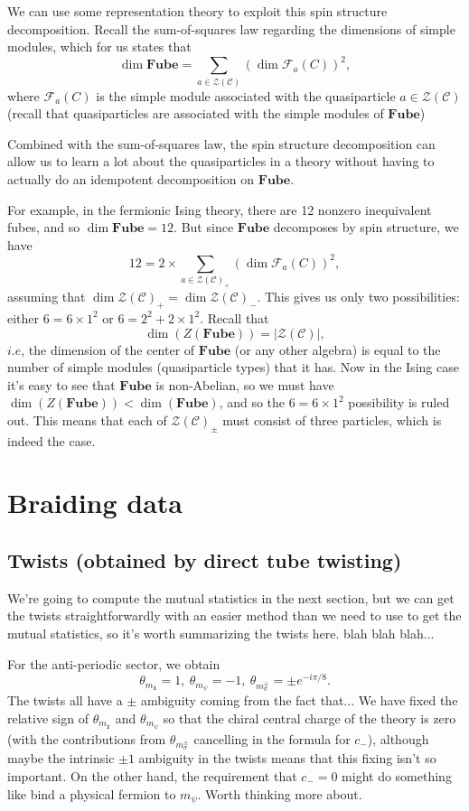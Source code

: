 \documentclass[12pt,a4paper]{article}
\newcommand{\unit}{\mathbf{1}}
\newcommand\be            {\begin{equation}}
\newcommand\ee            {\end{equation}}
\newcommand{\zc}{\mathcal{Z}(\mathcal{C})}
\newcommand{\fube}{\textbf{Fube}}
\newcommand{\fld}{\mathcal{F}}
\begin{document}
We can use some representation theory to exploit this spin structure decomposition. Recall the sum-of-squares law regarding the dimensions of simple modules, which for us states that 
\be \dim \fube = \sum_{a\in \zc} (\dim \fld_a(C))^2,\ee
where $\fld_a(C)$ is the simple module associated with the quasiparticle $a \in \zc$ (recall that quasiparticles are associated with the simple modules of $\fube$)

 Combined with the sum-of-squares law, the spin structure decomposition can allow us to learn a lot about the quasiparticles in a theory without having to actually do an idempotent decomposition on $\fube$. 
 
 For example, in the fermionic Ising theory, there are 12 nonzero inequivalent fubes, and so $\dim \fube = 12$. But since $\fube$ decomposes by spin structure, we have 
 \be 12 = 2 \times \sum_{a\in \zc_+} (\dim \fld_a(C))^2,\ee
 assuming that $\dim \zc_+ = \dim\zc_-$. This gives us only two possibilities: either $6 = 6\times1^2$ or $6 = 2^2 + 2\times 1^2$. Recall that 
 \be \dim(Z(\fube)) = |\zc|,\ee
 $i.e$, the dimension of the center of $\fube$ (or any other algebra) is equal to the number of simple modules (quasiparticle types) that it has. Now in the Ising case it's easy to see that $\fube$ is non-Abelian, so we must have $\dim(Z(\fube)) < \dim(\fube)$, and so the $6 = 6\times1^2$ possibility is ruled out. This means that each of $\zc_\pm$ must consist of three particles, which is indeed the case. 

\section{Braiding data}

\subsection{Twists (obtained by direct tube twisting)}
We're going to compute the mutual statistics in the next section, but we can get the twists straightforwardly with an easier method than we need to use to get the mutual statistics, so it's worth summarizing the twists here. blah blah blah...

For the anti-periodic sector, we obtain 
\be \theta_{m_\unit} = 1,\ \theta_{m_\psi} = -1,\ \theta_{m^\pm_\sigma} = \pm e^{-i\pi/8}.\ee
The twists all have a $\pm$ ambiguity coming from the fact that...
We have fixed the relative sign of $\theta_{m_\unit}$ and $\theta_{m_\psi}$ so that the chiral central charge of the theory is zero (with the contributions from $\theta_{m_\sigma^\pm}$ cancelling in the formula for $c_-$), although maybe the intrinsic $\pm1$ ambiguity in the twists means that this fixing isn't so important. On the other hand, the requirement that $c_-=0$ might do something like bind a physical fermion to $m_\psi$. Worth thinking more about. 
\end{document}
